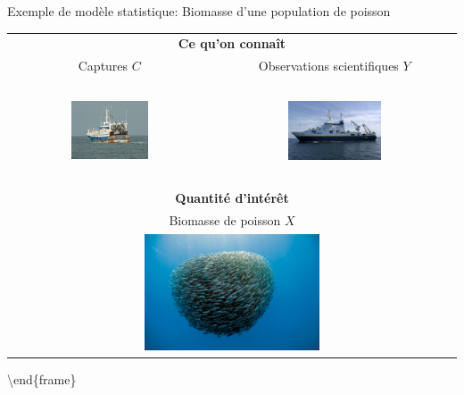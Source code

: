 \documentclass[ignorenonframetext,]{beamer}
\begin{document}
\begin{frame}{Exemple de modèle statistique: Biomasse d'une population
de poisson}
\protect\hypertarget{exemple-de-moduxe8le-statistique-biomasse-dune-population-de-poisson}{}

\begin{tabular}{cc}
\multicolumn{2}{c}{\textbf{Ce qu'on connaît}} \\ 
{\color{red} Captures $C$} & {\color{blue} Observations scientifiques $Y$}\\
\includegraphics[height = 3cm, width = 0.4\textwidth]{figures/chalutier} & \includegraphics[height = 3cm, width = 0.4\textwidth]{figures/thalassa}\\
\multicolumn{2}{c}{\textbf{Quantité d'intérêt}}\\ 
\multicolumn{2}{c}{Biomasse de poisson $X$}  \\ 
\multicolumn{2}{c}{\includegraphics[width = 0.4\textwidth]{figures/poissons}}
\end{tabular}

\textbackslash{}end\{frame\}

\end{frame}
\end{document}
